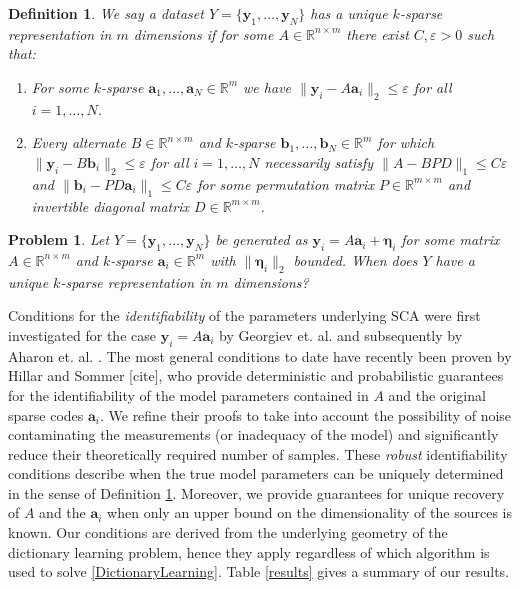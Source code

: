 \documentclass[journal, onecolumn]{IEEEtran}
\newtheorem{problem}{Problem}
\newtheorem{definition}{Definition}
\begin{document}
\begin{definition}\label{Uniqueness}
We say a dataset $Y = \{\mathbf{y}_1, \ldots, \mathbf{y}_N\}$ has a unique $k$-sparse representation in $m$ dimensions if for some $A \in \mathbb{R}^{n \times m}$ there exist $C, \varepsilon > 0$ such that:
\begin{enumerate}
\item For some $k$-sparse $\mathbf{a}_1, \ldots, \mathbf{a}_N \in \mathbb{R}^m$ we have $\|\mathbf{y}_i - A\mathbf{a}_i\|_2 \leq \varepsilon$ for all $i = 1, \ldots, N$.
\item Every alternate $B \in \mathbb{R}^{n \times m}$ and $k$-sparse $\mathbf{b}_1, \ldots, \mathbf{b}_N \in \mathbb{R}^m$ for which $\|\mathbf{y}_i - B\mathbf{b}_i\|_2 \leq \varepsilon$ for all $i = 1, \ldots, N$ necessarily satisfy $\|A - BPD\|_1 \leq C\varepsilon$ and $\|\mathbf{b}_i - PD\mathbf{a}_i\|_1 \leq C\varepsilon$ for some permutation matrix $P \in \mathbb{R}^{m \times m}$ and invertible diagonal matrix $D \in \mathbb{R}^{m \times m}$.
\end{enumerate}
\end{definition}

\begin{problem}\label{DUTproblem}
Let $Y = \{\mathbf{y}_1, \ldots, \mathbf{y}_N \}$ be generated as $\mathbf{y}_i = A\mathbf{a}_i  + \mathbf{\eta}_i$ for some matrix $A \in \mathbb{R}^{n \times m}$ and $k$-sparse $\mathbf{a}_i \in \mathbb{R}^m$ with $\|\mathbf{\eta}_i\|_2$ bounded. When does $Y$ have a unique $k$-sparse representation in $m$ dimensions?
\end{problem}

Conditions for the \emph{identifiability} of the parameters underlying SCA were first investigated for the case $\mathbf{y}_i = A\mathbf{a}_i$ by Georgiev et. al. \cite{Georgiev05} and subsequently by Aharon et. al. \cite{Aharon06}. The most general conditions to date have recently been proven by Hillar and Sommer [cite], who provide deterministic and probabilistic guarantees for the identifiability of the model parameters contained in $A$ and the original sparse codes $\mathbf{a}_i$. We refine their proofs to take into account the possibility of noise contaminating the measurements (or inadequacy of the model) and significantly reduce their theoretically required number of samples. These \emph{robust} identifiability conditions describe when the true model parameters can be uniquely determined in the sense of Definition \ref{Uniqueness}. Moreover, we provide guarantees for unique recovery of $A$ and the $\mathbf{a}_i$ when only an upper bound on the dimensionality of the sources is known. Our conditions are derived from the underlying geometry of the dictionary learning problem, hence they apply regardless of which algorithm is used to solve \eqref{DictionaryLearning}. Table \ref{results} gives a summary of our results.
\end{document}
